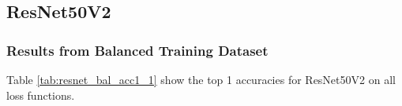 

\subsection{ResNet50V2}

\subsubsection{Results from Balanced Training Dataset}

Table \ref{tab:resnet_bal_acc1_1} show the top 1 accuracies for ResNet50V2 on all loss functions.

